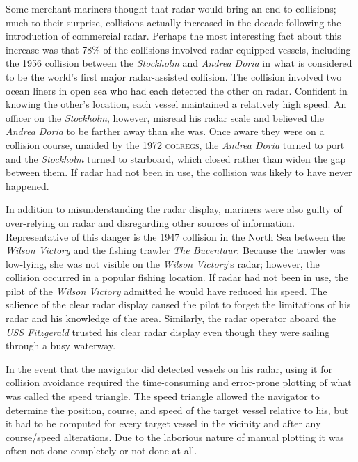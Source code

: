 \documentclass[twoside,symmetric,notoc]{tufte-book}
\begin{document}
\par{%
Some merchant mariners thought that radar would bring an end to collisions; much to their surprise, collisions actually increased in the decade following the introduction of commercial radar.\cite{Volk} Perhaps the most interesting fact about this increase was that 78\% of the collisions involved radar-equipped vessels, including the 1956 collision between the \textit{Stockholm} and \textit{Andrea Doria} in what is considered to be the world's first major radar-assisted collision. The collision involved two ocean liners in open sea who had each detected the other on radar. Confident in knowing the other's location, each vessel maintained a relatively high speed. An officer on the \textit{Stockholm}, however, misread his radar scale and believed the \textit{Andrea Doria} to be farther away than she was.\cite[-1in]{PBS} Once aware they were on a collision course, unaided by the 1972 \textsc{colregs}, the \textit{Andrea Doria} turned to port and the \textit{Stockholm} turned to starboard, which closed rather than widen the gap between them. If radar had not been in use, the collision was likely to have never happened.\cite[-0.7in]{Goldstein}
}
\par{%
In addition to misunderstanding the radar display, mariners were also guilty of over-relying on radar and disregarding other sources of information.\cite[-0.8in]{Stewart}\cite[-0.3in]{Schmidt} Representative of this danger is the 1947 collision in the North Sea between the \textit{Wilson Victory} and the fishing trawler \textit{The Bucentaur}. Because the trawler was low-lying, she was not visible on the \textit{Wilson Victory}'s radar; however, the collision occurred in a popular fishing location. If radar had not been in use, the pilot of the \textit{Wilson Victory} admitted he would have reduced his speed.\cite[-0.3in]{Wood_v_US} The salience of the clear radar display caused the pilot to forget the limitations of his radar and his knowledge of the area. Similarly, the radar operator aboard the \textit{USS Fitzgerald} trusted his clear radar display even though they were sailing through a busy waterway. 
}
\par{%
In the event that the navigator did detected vessels on his radar, using it for collision avoidance required the time-consuming and error-prone plotting of what was called the speed triangle. The speed triangle allowed the navigator to determine the position, course, and speed of the target vessel relative to his, but it had to be computed for every target vessel in the vicinity and after any course/speed alterations. Due to the laborious nature of manual plotting it was often not done completely or not done at all.\cite{Parsons} 
}
\end{document}
